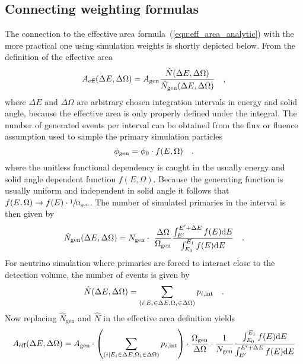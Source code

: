 \subsection{Connecting weighting formulas}
The connection to the effective area formula~(\ref{equ:eff_area_analytic}) with the more practical one using simulation weights is shortly depicted below.
From the definition of the effective area
\begin{equation}
  A_\text{eff}(\Delta E, \Delta \Omega) =
    A_\text{gen} \frac{\hat{N}(\Delta E, \Delta \Omega)}
                      {\hat{N}_\text{gen}(\Delta E, \Delta \Omega)}
  \quad\text{,}
\end{equation}
where $\Delta E$ and $\Delta \Omega$ are arbitrary chosen integration intervals in energy and solid angle, because the effective area is only properly defined under the integral.
The number of generated events per interval can be obtained from the flux or fluence assumption used to sample the primary simulation particles
\begin{equation}
  \phi_\text{gen} = \phi_0 \cdot f(E, \Omega)
  \quad\text{.}
\end{equation}
where the unitless functional dependency is caught in the usually energy and solid angle dependent function $f(E, \Omega)$.
Because the generating function is usually uniform and independent in solid angle it follows that $f(E, \Omega) \rightarrow f(E)\cdot \sfrac{1}{\Omega_\text{gen}}$.
The number of simulated primaries in the interval is then given by
\begin{equation}
  \hat{N}_\text{gen}(\Delta E, \Delta\Omega) =
    N_\text{gen} \cdot \frac{\Delta\Omega}{\Omega_\text{gen}}
    \frac{\int_{E'}^{E'+\Delta E} f(E) \d{E}}
         {\int_{E_0}^{E_1} f(E) \d{E}}
  \mperiod
\end{equation}
For neutrino simulation where primaries are forced to interact close to the detection volume, the number of events is given by
\begin{equation}
  \hat{N}(\Delta E, \Delta \Omega) =
  \sum_{(i|E_i\in\Delta E, \Omega_i\in\Delta\Omega)} p_{i,\text{int}}
  \quad\text{.}
\end{equation}
Now replacing $\hat{N}_\text{gen}$ and $\hat{N}$ in the effective area definition yields
\begin{equation}
  A_\text{eff}(\Delta E, \Delta \Omega) =
    A_\text{gen} \cdot
    \left(\sum_{(i|E_i\in\Delta E, \Omega_i\in\Delta\Omega)}
          p_{i,\text{int}}\right) \cdot
    \frac{\Omega_\text{gen}}{\Delta\Omega} \cdot \frac{1}{N_\text{gen}}
    \frac{\int_{E_0}^{E_1} f(E) \mathrm{d}E}
         {\int_{E'}^{E'+\Delta E} f(E) \mathrm{d}E}
\end{equation}
